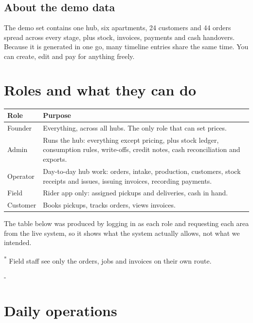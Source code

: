\documentclass[11pt,a4paper]{article}
\makeatletter
\newcommand{\needspace}[1]{\par\begingroup\setlength{\dimen@}{#1}%
  \dimen@ii\pagegoal\advance\dimen@ii-\pagetotal
  \ifdim\dimen@>\dimen@ii\ifdim\dimen@ii>\z@\vfil\fi\break\fi\endgroup}
\makeatother
\begin{document}
\subsection{About the demo data}
The demo set contains one hub, six apartments, 24 customers and 44 orders
spread across every stage, plus stock, invoices, payments and cash
handovers. Because it is generated in one go, many timeline entries share
the same time. You can create, edit and pay for anything freely.

\section{Roles and what they can do}

\begin{tabularx}{\textwidth}{@{}lX@{}}
\toprule
\textbf{Role} & \textbf{Purpose} \\
\midrule
Founder & Everything, across all hubs. The only role that can set prices. \\
Admin & Runs the hub: everything except pricing, plus stock ledger,
consumption rules, write-offs, credit notes, cash reconciliation and exports. \\
Operator & Day-to-day hub work: orders, intake, production, customers,
stock receipts and issues, issuing invoices, recording payments. \\
Field & Rider app only: assigned pickups and deliveries, cash in hand. \\
Customer & Books pickups, tracks orders, views invoices. \\
\bottomrule
\end{tabularx}

\medskip
The table below was produced by logging in as each role and requesting
each area from the live system, so it shows what the system actually
allows, not what we intended.

\begin{center}
\small

\end{center}
{\small\color{muted}\textsuperscript{*} Field staff see only the orders,
jobs and invoices on their own route.}

\needspace{11cm}
\section{Daily operations}
\end{document}
